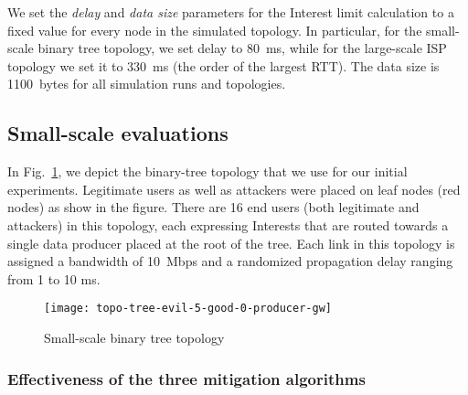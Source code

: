 We set the \emph{delay} and \emph{data size} parameters for the Interest limit calculation to a fixed value for every node in the simulated topology. In particular, for the small-scale binary tree topology, we set delay to 80~ms, while for the large-scale ISP topology we set it to 330~ms (the order of the largest RTT). The data size is 1100~bytes for all simulation runs and topologies.


\subsection{Small-scale evaluations}
\label{sec:small-scale}

In Fig.~\ref{fig:small-scale}, we depict the binary-tree topology that we use for our initial experiments.
Legitimate users as well as attackers were placed on leaf nodes (red nodes) as show in the figure. There are 16 end users (both legitimate and attackers) in this topology, each expressing Interests that are routed towards a single data producer placed at the root of the tree.  Each link in this topology is assigned a bandwidth of 10~Mbps and a randomized propagation delay ranging from 1 to 10 ms. 


\begin{figure}[]
  \centering
  \texttt{[image: topo-tree-evil-5-good-0-producer-gw]}
  \caption{Small-scale binary tree topology}
  \label{fig:small-scale}
\end{figure}


\subsubsection{Effectiveness of the three mitigation algorithms}

